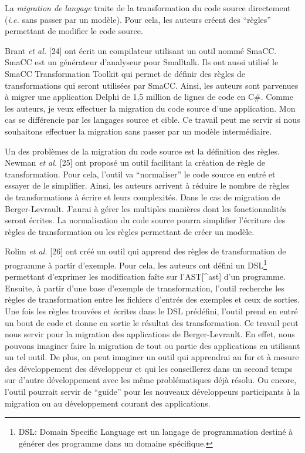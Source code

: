 \documentclass[11pt,]{article}
\begin{document}
La \emph{migration de langage} traite de la transformation du code
source directement (\emph{i.e.} sans passer par un modèle). Pour cela,
les auteurs créent des ``règles'' permettant de modifier le code source.

Brant \emph{et al.} {[}24{]} ont écrit un compilateur utilisant un outil
nommé SmaCC. SmaCC est un générateur d'analyseur pour Smalltalk. Ils ont
aussi utilisé le SmaCC Transformation Toolkit qui permet de définir des
règles de transformations qui seront utilisées par SmaCC. Ainsi, les
auteurs sont parvenues à migrer une application Delphi de 1,5 million de
lignes de code en C\#. Comme les auteurs, je veux effectuer la migration
du code source d'une application. Mon cas se différencie par les
langages source et cible. Ce travail peut me servir si nous souhaitons
effectuer la migration sans passer par un modèle intermédiaire.

Un des problèmes de la migration du code source est la définition des
règles. Newman \emph{et al.} {[}25{]} ont proposé un outil facilitant la
création de règle de transformation. Pour cela, l'outil va
``normaliser'' le code source en entré et essayer de le simplifier.
Ainsi, les auteurs arrivent à réduire le nombre de règles de
transformations à écrire et leurs complexités. Dans le cas de migration
de Berger-Levrault. J'aurai à gérer les multiples manières dont les
fonctionnalités seront écrites. La normalisation du code source pourra
simplifier l'écriture des règles de transformation ou les règles
permettant de créer un modèle.

Rolim \emph{et al.} {[}26{]} ont créé un outil qui apprend des règles de
transformation de programme à partir d'exemple. Pour cela, les auteurs
ont défini un DSL\footnote{DSL: Domain Specific Language est un langage
  de programmation destiné à générer des programme dans un domaine
  spécifique.} permettant d'exprimer les modification faîte sur
l'AST{[}\^{}ast{]} d'un programme. Ensuite, à partir d'une base
d'exemple de transformation, l'outil recherche les règles de
transformation entre les fichiers d'entrés des exemples et ceux de
sorties. Une fois les règles trouvées et écrites dans le DSL prédéfini,
l'outil prend en entré un bout de code et donne en sortie le résultat
des transformation. Ce travail peut nous servir pour la migration des
applications de Berger-Levrault. En effet, nous pouvons imaginer faire
la migration de tout ou partie des applications en utilisant un tel
outil. De plus, on peut imaginer un outil qui apprendrai au fur et à
mesure des développement des développeur et qui les conseillerez dans un
second temps sur d'autre développement avec les même problématiques déjà
résolu. Ou encore, l'outil pourrait servir de ``guide'' pour les
nouveaux développeurs participants à la migration ou au développement
courant des applications.
\end{document}
